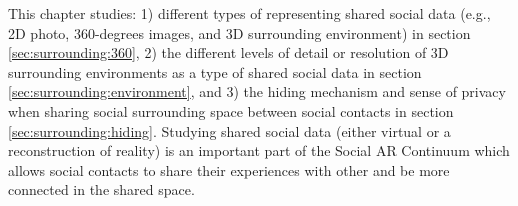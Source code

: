 


This chapter studies: 1) different types of representing shared social data (e.g., 2D photo, 360-degrees images, and 3D surrounding environment) in section \ref{sec:surrounding:360}, 2) the different levels of detail or resolution of 3D surrounding environments as a type of shared social data in section \ref{sec:surrounding:environment}, and 3) the hiding mechanism and sense of privacy when sharing social surrounding space between social contacts in section \ref{sec:surrounding:hiding}. Studying shared social data (either virtual or a reconstruction of reality) is an important part of the Social AR Continuum which allows social contacts to share their experiences with other and be more connected in the shared space. 






